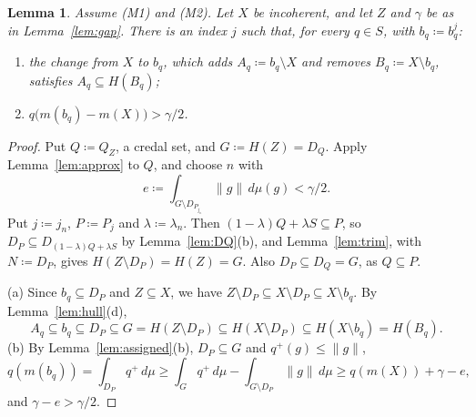 \documentclass[11pt]{article}
\newtheorem{lemma}[theorem]{Lemma}
\theoremstyle{definition}
\begin{document}
\begin{lemma}\label{lem:choice}
Assume (M1) and (M2). Let $X$ be incoherent, and let $Z$ and $\gamma$ be as in Lemma~\ref{lem:gap}. There is an index $j$ such that, for every $q\in S$, with $b_q\coloneqq b^j_q$:
\begin{enumerate}[label=(\alph*)]
\item the change from $X$ to $b_q$, which adds $A_q\coloneqq b_q\setminus X$ and removes $B_q\coloneqq X\setminus b_q$, satisfies $A_q\subseteq H(B_q)$;
\item $q\bigl(m(b_q)-m(X)\bigr)>\gamma/2$.
\end{enumerate}
\end{lemma}
\begin{proof}
Put $Q\coloneqq Q_Z$, a credal set, and $G\coloneqq H(Z)=D_Q$. Apply Lemma~\ref{lem:approx} to $Q$, and choose $n$ with
\[
e\coloneqq\int_{G\setminus D_{P_{j_n}}}\|g\|\,d\mu(g)<\gamma/2 .
\]
Put $j\coloneqq j_n$, $P\coloneqq P_j$ and $\lambda\coloneqq\lambda_n$. Then $(1-\lambda)Q+\lambda S\subseteq P$, so $D_P\subseteq D_{(1-\lambda)Q+\lambda S}$ by Lemma~\ref{lem:DQ}(b), and Lemma~\ref{lem:trim}, with $N\coloneqq D_P$, gives $H(Z\setminus D_P)=H(Z)=G$. Also $D_P\subseteq D_Q=G$, as $Q\subseteq P$.

(a) Since $b_q\subseteq D_P$ and $Z\subseteq X$, we have $Z\setminus D_P\subseteq X\setminus D_P\subseteq X\setminus b_q$. By Lemma~\ref{lem:hull}(d),
\[
A_q\subseteq b_q\subseteq D_P\subseteq G=H(Z\setminus D_P)\subseteq H(X\setminus D_P)\subseteq H(X\setminus b_q)=H(B_q).
\]
(b) By Lemma~\ref{lem:assigned}(b), $D_P\subseteq G$ and $q^+(g)\le\|g\|$,
\[
q(m(b_q))=\int_{D_P}q^+\,d\mu\ge\int_Gq^+\,d\mu-\int_{G\setminus D_P}\|g\|\,d\mu\ge q(m(X))+\gamma-e,
\]
and $\gamma-e>\gamma/2$.
\end{proof}
\end{document}
